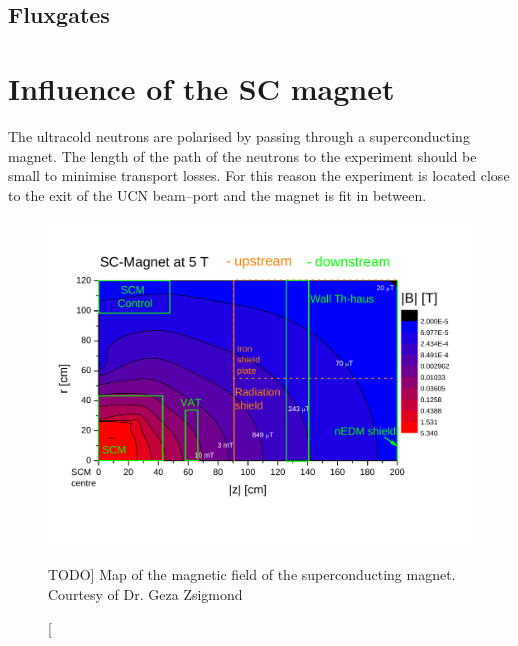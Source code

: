 \subsection{Fluxgates}


\section{Influence of the SC magnet}
The ultracold neutrons are polarised by passing through a superconducting magnet. The length of the path of the neutrons to the experiment should be small to minimise transport losses. For this reason the experiment is located close to the exit of the UCN beam--port and the magnet is fit in between.

\begin{figure}
  \myfloatalign
  \includegraphics[width=.7\linewidth]{gfx/nEDM_SFC/SCM_magn_map.pdf}
  \caption
  [TODO]
  {Map of the magnetic field of the superconducting magnet. Courtesy of Dr. Geza Zsigmond}
  \label{fig:nEDM_SFC_SC_magnet_map}
\end{figure}

